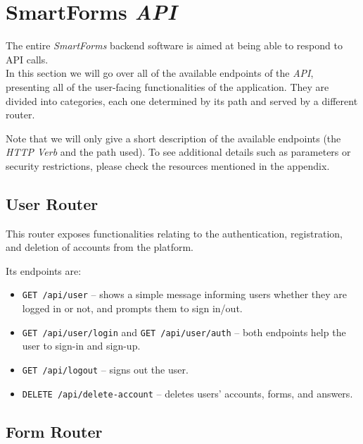 \documentclass[11pt, a4paper]{report}
\def\code#1{\texttt{#1}}
\begin{document}
\section{SmartForms \textit{API}}

The entire \textit{SmartForms} backend software is aimed at being able to respond to API calls.\\
In this section we will go over all of the available endpoints of the \textit{API}, presenting all of the user-facing functionalities of the application. They are divided into categories, each one determined by its path and served by a different router.

Note that we will only give a short description of the available endpoints (the \textit{HTTP Verb} and the path used). To see additional details such as parameters or security restrictions, please check the resources mentioned in the appendix.

\subsection{User Router}

This router exposes functionalities relating to the authentication, registration, and deletion of accounts from the platform.

Its endpoints are:
\begin{itemize}
    \item \code{GET /api/user} -- shows a simple message informing users whether they are logged in or not, and prompts them to sign in/out.
    \item \code{GET /api/user/login} and \code{GET /api/user/auth} -- both endpoints help the user to sign-in and sign-up.
    \item \code{GET /api/logout} -- signs out the user.
    \item \code{DELETE /api/delete-account} -- deletes users' accounts, forms, and answers.
\end{itemize}

\subsection{Form Router}
\end{document}
